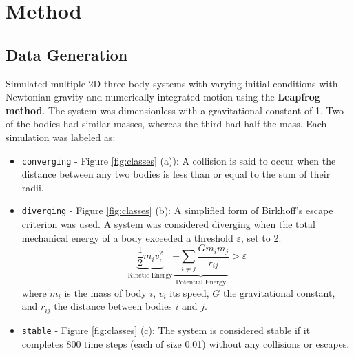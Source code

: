\documentclass[%
 reprint,
 amsmath,amssymb,
 aps,
]{revtex4-2}
\begin{document}




\section{\label{sec:method}Method} %


\subsection{Data Generation}

Simulated multiple 2D three-body systems with varying initial conditions with Newtonian gravity and numerically integrated motion using the \textbf{Leapfrog method}. The system was dimensionless with a gravitational constant of 1. Two of the bodies had similar masses, whereas the third had half the mass.
Each simulation was labeled as: 

\begin{itemize}
    \item \texttt{converging} - Figure \ref{fig:classes} (a)): A collision is said to occur when the distance between any two bodies is less than or equal to the sum of their radii.
    
    \item \texttt{diverging} - Figure \ref{fig:classes} (b): A simplified form of Birkhoff's escape criterion \cite{birkhoff1927dynamical} was used. A system was considered diverging when the total mechanical energy of a body exceeded a threshold $\varepsilon$, set to 2:
    \[
    \underbrace{\frac{1}{2}m_i v_i^2}_{\text{Kinetic Energy}} \underbrace{-\sum_{i \ne j} \frac{G m_i m_j}{r_{ij}}}_{\text{Potential Energy}} > \varepsilon
    \] 
    where $m_i$ is the mass of body $i$, $v_i$ its speed, $G$ the gravitational constant, and $r_{ij}$ the distance between bodies $i$ and $j$.

    \item \texttt{stable} - Figure \ref{fig:classes} (c): The system is considered stable if it completes 800 time steps (each of size 0.01) without any collisions or escapes.
\end{itemize}
\end{document}
